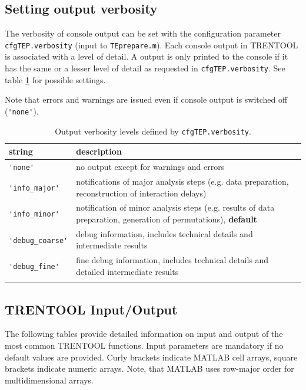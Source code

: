 \documentclass[a4paper,10pt]{article}
\begin{document}
\subsection{Setting output verbosity} \label{sec:verbosity}
The verbosity of console output can be set with the configuration parameter \verb&cfgTEP.verbosity& (input to \verb&TEprepare.m&). Each console output in TRENTOOL is associated with a level of detail. A output is only printed to the console if it has the same or a lesser level of detail as requested in \verb&cfgTEP.verbosity&. See table \ref{tab:verbosity} for possible settings.

Note that errors and warnings are issued even if console output is switched off (\verb&'none'&).

\begin{table}[H]
\small
\caption[Output Verbosity Levels]{Output verbosity levels defined by \texttt{cfgTEP.verbosity}.} 
\begin{tabular}{p{2.5cm}p{10cm}} \toprule
\textbf{string} & \textbf{description} \\ \midrule
\verb+'none'+ & no output except for warnings and errors \\
\rowcolor{Gray}
\verb+'info_major'+ & notifications of major analysis steps (e.g. data preparation, reconstruction of interaction delays)\\
\verb+'info_minor'+ & notification of minor analysis steps (e.g. results of data preparation, generation of permutations), \textbf{default}\\
\rowcolor{Gray}
\verb+'debug_coarse'+ & debug information, includes technical details and intermediate results\\
\verb+'debug_fine'+ & fine debug information, includes technical details and detailed intermediate results\\
\bottomrule
\label{tab:verbosity}
\end{tabular}
\end{table}


\subsection{TRENTOOL Input/Output}

The following tables provide detailed information on input and output of the most common TRENTOOL functions. Input parameters are mandatory if no default values are provided. Curly brackets indicate MATLAB cell arrays, square brackets indicate numeric arrays. Note, that MATLAB uses row-major order for multidimensional arrays.
\end{document}
